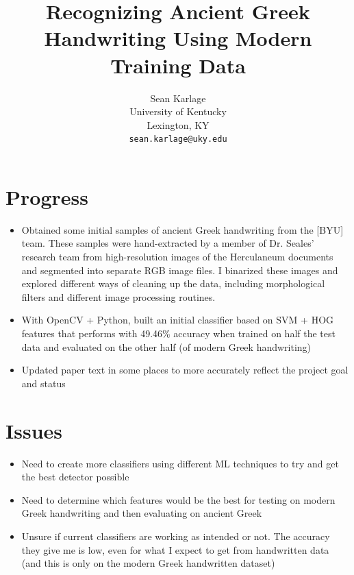 \documentclass[10pt,twocolumn,letterpaper]{article}
\begin{document}
\title{Recognizing Ancient Greek Handwriting Using Modern Training Data}

\author{Sean Karlage\\
University of Kentucky\\
Lexington, KY\\
{\tt\small sean.karlage@uky.edu}
}

\maketitle

\section{Progress}
\begin{itemize}
    \item Obtained some initial samples of ancient Greek handwriting from the [BYU] team. These samples were hand-extracted by a member of Dr. Seales' research team from high-resolution images of the Herculaneum documents and segmented into separate RGB image files. I binarized these images and explored different ways of cleaning up the data, including morphological filters and different image processing routines.
    \item With OpenCV + Python, built an initial classifier based on SVM + HOG features that performs with 49.46\% accuracy when trained on half the test data and evaluated on the other half (of modern Greek handwriting)
    \item Updated paper text in some places to more accurately reflect the project goal and status
\end{itemize}

\section{Issues}
\begin{itemize}
    \item Need to create more classifiers using different ML techniques to try and get the best detector possible
    \item Need to determine which features would be the best for testing on modern Greek handwriting and then evaluating on ancient Greek
    \item Unsure if current classifiers are working as intended or not. The accuracy they give me is low, even for what I expect to get from handwritten data (and this is only on the modern Greek handwritten dataset)
\end{itemize}
\end{document}
